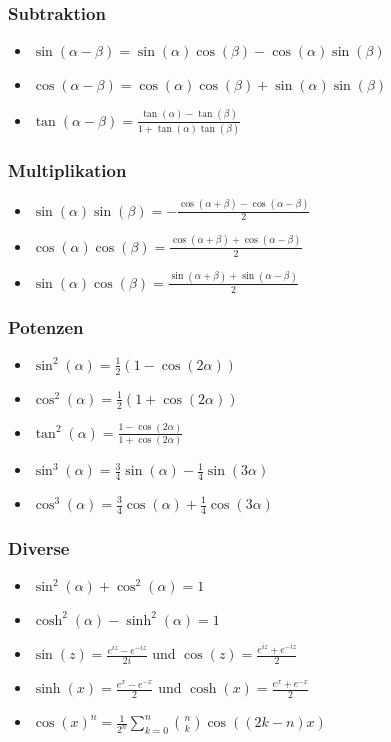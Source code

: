 \documentclass[a4paper,10pt]{article}
\begin{document}
\subsubsection{Subtraktion}
\begin{itemize}
	\item $\sin(\alpha - \beta) = \sin(\alpha) \cos(\beta) - \cos(\alpha)\sin(\beta)$
	\item $\cos(\alpha - \beta) = \cos(\alpha) \cos(\beta) + \sin(\alpha)\sin(\beta)$
	\item $\tan(\alpha - \beta) = \frac{\tan(\alpha) - \tan(\beta)}{1+\tan(\alpha) \tan(\beta)}$
\end{itemize}

\subsubsection{Multiplikation}
\begin{itemize}
	\item $\sin(\alpha) \sin(\beta) = -\frac{\cos(\alpha + \beta) - \cos(\alpha - \beta)}{2}$
	\item $\cos(\alpha) \cos(\beta) =  \frac{\cos(\alpha + \beta) + \cos(\alpha - \beta)}{2}$
	\item $\sin(\alpha) \cos(\beta) =  \frac{\sin(\alpha + \beta) + \sin(\alpha - \beta)}{2}$
\end{itemize}

\subsubsection{Potenzen}
\begin{itemize}
	\item $\sin^2(\alpha) = \frac{1}{2}(1-\cos(2\alpha))$
	\item $\cos^2(\alpha) = \frac{1}{2}(1+\cos(2\alpha))$
	\item $\tan^2(\alpha) = \frac{1-\cos(2\alpha)}{1+\cos(2\alpha)}$
	\item $\sin^3(\alpha) = \frac{3}{4} \sin(\alpha) - \frac{1}{4} \sin(3 \alpha)$
	\item $\cos^3(\alpha) = \frac{3}{4} \cos(\alpha) + \frac{1}{4} \cos(3 \alpha)$
\end{itemize}

\subsubsection{Diverse}

\begin{itemize}
	\item $\sin^2(\alpha) + \cos^2(\alpha) = 1$
	\item $\cosh^2(\alpha) - \sinh^2(\alpha) = 1$
	\item $\sin(z) = \frac{e^{iz} - e^{-iz}}{2i}$ und $\cos(z) = \frac{e^{iz} + e^{-iz}}{2}$
	\item $\sinh(x) = \frac{e^x - e^{-x}}{2}$ und $\cosh(x) = \frac{e^x + e^{-x}}{2}$
	\item $\cos(x)^n = \frac{1}{2^n} \sum_{k=0}^n {n \choose k} \cos((2k - n)x)$
\end{itemize}
\end{document}
